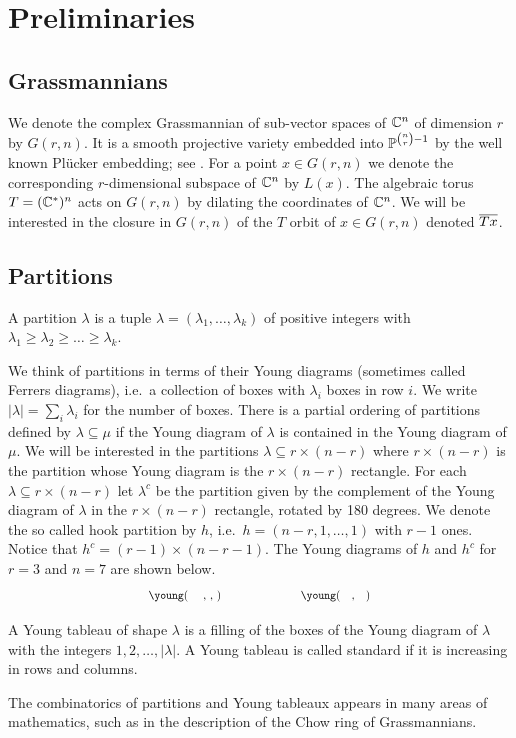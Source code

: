 \section{Preliminaries}

\subsection{Grassmannians}
We denote the complex Grassmannian of sub-vector spaces of ${\mathbb C}^n$ of dimension $r$ by $G(r,n)$. It is a smooth projective variety embedded into ${\mathbb P}^{\binom{n}{r}-1}$ by the well known Plücker embedding; see \cite{EisHar}. For a point \(x\in G(r,n)\) we denote the corresponding \(r\)-dimensional subspace of \({\mathbb C}^n\) by \(L(x)\). The algebraic torus $T = ({\mathbb C}^*)^n$ acts on $G(r,n)$ by dilating the coordinates of ${\mathbb C}^n$. We will be interested in the closure in $G(r,n)$ of the $T$ orbit of $x \in G(r,n)$ denoted ${\overline{Tx}}$.

\subsection{Partitions}
\begin{definition}
    A partition $\lambda$ is a tuple $\lambda = (\lambda_1, \dots , \lambda_k)$ of positive integers with $\lambda_1 \geq \lambda_2 \geq \dots \geq \lambda_k$.
\end{definition}
We think of partitions in terms of their Young diagrams (sometimes called Ferrers diagrams), i.e.\ a collection of boxes with $\lambda_i$ boxes in row $i$. We write $|\lambda| = \sum_i\lambda_i$ for the number of boxes. There is a partial ordering of partitions defined by $\lambda \subseteq \mu$ if the Young diagram of $\lambda$ is contained in the Young diagram of $\mu$. We will be interested in the partitions $\lambda \subseteq r\times(n-r)$ where $r\times (n-r)$ is the partition whose Young diagram is the $r \times (n-r)$ rectangle. For each $\lambda \subseteq r\times (n-r)$ let $\lambda^c$ be the partition given by the complement of the Young diagram of $\lambda$ in the $r \times (n-r)$ rectangle, rotated by 180 degrees. We denote the so called hook partition by $h$, i.e.\ $h = (n-r,1,\dots,1)$ with $r-1$ ones. Notice that $h^c = (r-1)\times(n-r-1)$. The Young diagrams of $h$ and $h^c$ for $r=3$ and $n=7$ are shown below.
\begin{equation*}
        \scalebox{0.8}{\young(~~~~,~,~)} \hspace{2cm} \scalebox{0.8}{\young(~~~,~~~)}
    \end{equation*}
\begin{definition}
    A Young tableau of shape $\lambda$ is a filling of the boxes of the Young diagram of $\lambda$ with the integers $1,2,\dots, |\lambda|$. A Young tableau is called standard if it is increasing in rows and columns.
\end{definition}
The combinatorics of partitions and Young tableaux appears in many areas of mathematics, such as in the description of the Chow ring of Grassmannians.

